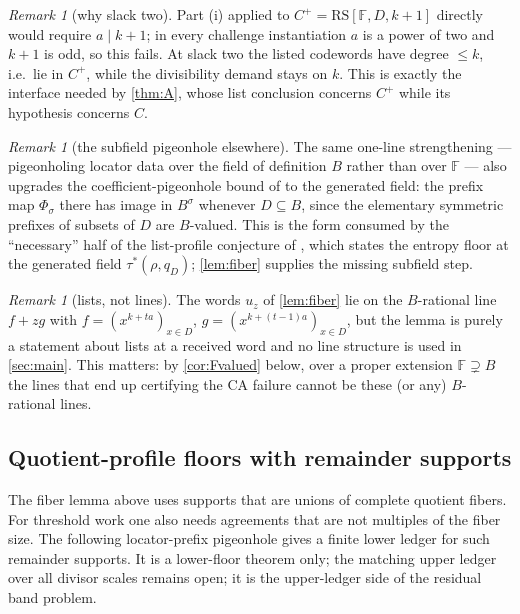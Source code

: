 \documentclass[11pt]{article}
\theoremstyle{definition}
\theoremstyle{remark}
\newtheorem{remark}[theorem]{Remark}
\newcommand{\F}{\mathbb{F}}
\newcommand{\B}{B}
\newcommand{\RS}{\mathrm{RS}}
\begin{document}
\begin{remark}[why slack two]\label{rem:slacktwo}
Part (i) applied to $C^+=\RS[\F,D,k+1]$ directly would require $a\mid k+1$; in every challenge instantiation $a$ is a power of two and $k+1$ is odd, so this fails. At slack two the listed codewords have degree $\le k$, i.e.\ lie in $C^+$, while the divisibility demand stays on $k$. This is exactly the interface needed by \cref{thm:A}, whose list conclusion concerns $C^+$ while its hypothesis concerns $C$.
\end{remark}

\begin{remark}[the subfield pigeonhole elsewhere]\label{rem:subpigeon}
The same one-line strengthening --- pigeonholing locator data over the field of definition $\B$ rather than over $\F$ --- also upgrades the coefficient-pigeonhole bound of \cite{Cho26b} to the generated field: the prefix map $\Phi_\sigma$ there has image in $\B^\sigma$ whenever $D\subseteq\B$, since the elementary symmetric prefixes of subsets of $D$ are $\B$-valued. This is the form consumed by the ``necessary'' half of the list-profile conjecture of \cite{Cho26b}, which states the entropy floor at the generated field $\tau^{*}(\rho,q_D)$; \cref{lem:fiber} supplies the missing subfield step.
\end{remark}

\begin{remark}[lists, not lines]\label{rem:lines}
The words $u_z$ of \cref{lem:fiber} lie on the $\B$-rational line $f+zg$ with $f=(x^{k+ta})_{x\in D}$, $g=(x^{k+(t-1)a})_{x\in D}$, but the lemma is purely a statement about lists at a received word and no line structure is used in \cref{sec:main}. This matters: by \cref{cor:Fvalued} below, over a proper extension $\F\supsetneq\B$ the lines that end up certifying the CA failure cannot be these (or any) $\B$-rational lines.
\end{remark}

\subsection{Quotient-profile floors with remainder supports}
\label{sec:quotient-remainder}

The fiber lemma above uses supports that are unions of complete quotient fibers.
For threshold work one also needs agreements that are not multiples of the fiber
size.  The following locator-prefix pigeonhole gives a finite lower ledger for
such remainder supports.  It is a lower-floor theorem only; the matching upper
ledger over all divisor scales remains open; it is the upper-ledger side of the residual band problem.
\end{document}
